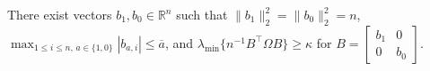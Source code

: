 There exist vectors \(b_1,b_0\in\mathbb R^n\) such that \(\lVert b_1\rVert_2^2=\lVert b_0\rVert_2^2=n\), \(\max_{1\le i\le n,\,a\in\{1,0\}}|b_{a,i}|\le\overline a\), and \(\lambda_{\min}\{n^{-1}B^{\top}\Omega B\}\ge\kappa\) for \(B=\begin{bmatrix}b_1&0\\0&b_0\end{bmatrix}\).
